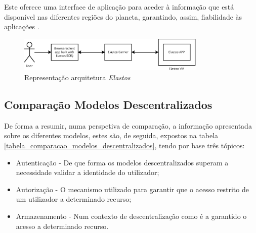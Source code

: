 Este oferece uma interface de aplicação para aceder à informação que está disponível nas diferentes regiões do planeta, garantindo, assim, fiabilidade às aplicações \cite{elastos_white_paper}.

\begin{figure}[H]
    \begin{center}
        \includegraphics[width=0.8\textwidth]{figures/estado_arte-Elastos.eps}
        \caption{Representação arquitetura \emph{Elastos}}
        \label{estado_arte_representacao_elastos}
    \end{center}
\end{figure}

\subsection{Comparação Modelos Descentralizados}

De forma a resumir, numa perspetiva de comparação, a informação apresentada sobre os diferentes modelos, estes são, de seguida, expostos na  tabela \ref{tabela_comparacao_modelos_descentralizados}, tendo por base três tópicos:
\begin{itemize}
    \item Autenticação - De que forma os modelos descentralizados superam a necessidade validar a identidade do utilizador;
    \item Autorização - O mecanismo utilizado para garantir que o acesso restrito de um utilizador a determinado recurso;
    \item Armazenamento - Num contexto de descentralização como é a garantido o acesso a determinado recurso.
\end{itemize}

